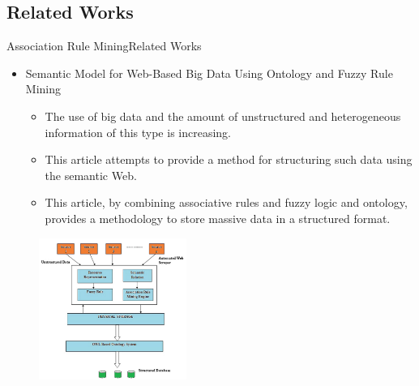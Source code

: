 \documentclass[10pt]{beamer}
\begin{document}
\subsection{Related Works}

\begin{frame}{Association Rule Mining}{Related Works}
\begin{itemize}
\item Semantic Model for Web-Based Big Data Using Ontology and Fuzzy Rule Mining \cite{das2016semantic}
\begin{itemize}
\item The use of big data and the amount of unstructured and heterogeneous information of this type is increasing.
\item  This article attempts to provide a method for structuring such data using the semantic Web.
\item This article, by combining associative rules and fuzzy logic and ontology, provides a methodology to store massive data in a structured format.
\end{itemize}
\end{itemize}
\begin{figure}[H]
	\centering
	\includegraphics[width=0.43\textwidth]{images/Methodology.PNG}
	\label{fig:Methodology}
\end{figure}
\end{frame}
\end{document}
